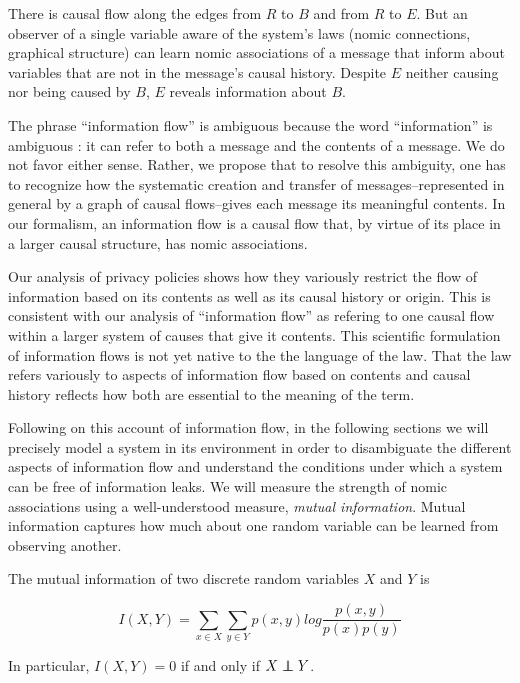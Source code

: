 \documentclass[../thesis.tex]{subfiles}
\begin{document}
There is causal flow along the edges from
$R$ to $B$ and from $R$ to $E$.
But an observer of a single variable aware of the
system's laws (nomic connections,
graphical structure) can learn nomic associations
of a message that inform about variables that
are not in the message's causal history.
Despite $E$ neither causing nor being caused by $B$,
$E$ reveals information about $B$.

The phrase ``information flow'' is ambiguous because the
word ``information'' is ambiguous \cite{nunberg1996farewell}:
it can refer to both a message and the contents of a message.
We do not favor either sense.
Rather, we propose that to resolve this ambiguity,
one has to recognize how the systematic creation and
transfer of messages--represented in general by a graph
of causal flows--gives each message its meaningful
contents.
In our formalism, an information flow is a causal flow
that, by virtue of its place in a larger causal structure,
has nomic associations.

Our analysis of privacy policies shows how
they variously restrict the flow
of information based on its contents as well as its
causal history or origin.
This is consistent with our analysis of ``information flow''
as refering to one causal flow within a larger system
of causes that give it contents.
This scientific formulation of information flows is not
yet native to the the language of the law.
That the law refers variously to aspects of information flow
based on contents and causal history reflects how
both are essential to the meaning of the term.

Following on this account of information flow,
in the following sections we will precisely model a system
in its environment
in order to disambiguate the different
aspects of information flow and understand the conditions
under which a system can be free of information leaks.
We will measure the strength of
nomic associations using a well-understood measure,
\emph{mutual information}.
Mutual information 
captures how much about one random variable can be
learned from observing another.

\begin{dfn}
  The mutual information of two discrete random variables
  $X$ and $Y$ is

  $$I(X,Y) = \sum_{x \in X} \sum_{y \in Y} p(x,y) log \frac{p(x,y)}{p(x)p(y)}$$
\end{dfn}

In particular, $I(X,Y) = 0$ if and only if $X \independent Y$.
\end{document}
